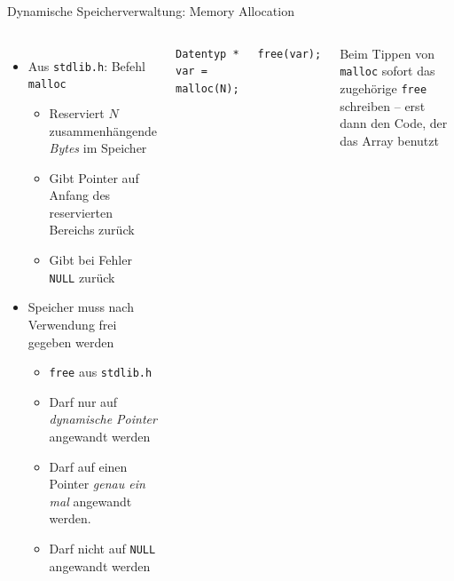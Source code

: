 \begin{frame}[fragile]{Dynamische Speicherverwaltung: Memory Allocation}
%
\begin{columns}
\begin{itemize}
\item Aus \texttt{stdlib.h}: Befehl \texttt{malloc}
	\begin{itemize}
	\item Reserviert $N$ zusammenhängende \emph{Bytes} im Speicher
	\item Gibt Pointer auf Anfang des reservierten Bereichs zurück
	\item Gibt bei Fehler \texttt{NULL} zurück
	\end{itemize}
\item Speicher muss nach Verwendung frei gegeben werden
\begin{itemize}
	\item \texttt{free} aus \texttt{stdlib.h}
	\item Darf nur auf \emph{dynamische Pointer} angewandt werden
	\item Darf auf einen Pointer \emph{genau ein mal} angewandt werden.
	\item Darf nicht auf \texttt{NULL} angewandt werden
\end{itemize}

\end{itemize}
%
\begin{codebox}
\begin{verbatim}
Datentyp * var = malloc(N);
\end{verbatim}
\end{codebox}
%
\begin{codebox}
\begin{verbatim}
free(var);
\end{verbatim}
\end{codebox}
%
\begin{hintbox}
Beim Tippen von \texttt{malloc} sofort das zugehörige \texttt{free} schreiben -- erst dann den Code, der das Array benutzt
\end{hintbox}
\end{columns}

%
\end{frame}


